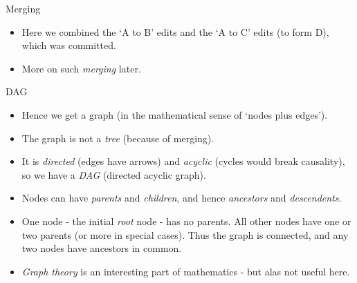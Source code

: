 \documentclass[usenames,dvipsnames]{beamer}
\begin{document}
\begin{frame}{Merging}
  \begin{figure}
    \begin{center}
    \end{center}
  \end{figure}
  \begin{block}{}
    \begin{itemize}
      \item{Here we combined the `A to B' edits and the `A to C' edits (to form D), which was committed.}
      \item{More on such \textit{merging} later.}
    \end{itemize}
  \end{block}
\end{frame}


\begin{frame}{DAG}
  \begin{block}{}
    \begin{itemize}
      \item{Hence we get a graph (in the mathematical sense of `nodes plus edges').}
      \item{The graph is not a \textit{tree} (because of merging).}
      \item{It is \textit{directed} (edges have arrows) and \textit{acyclic} (cycles would break causality), so we have a \textit{DAG} (directed acyclic graph).}
      \item{Nodes can have \textit{parents} and \textit{children}, and hence \textit{ancestors} and \textit{descendents}.}
      \item{One node - the initial \textit{root} node - has no parents. All other nodes have one or two parents (or more in special cases). Thus the graph is connected, and any two nodes have ancestors in common.}
      \item{\textit{Graph theory} is an interesting part of mathematics - but alas not useful here.}
    \end{itemize}
  \end{block}
\end{frame}
\end{document}
